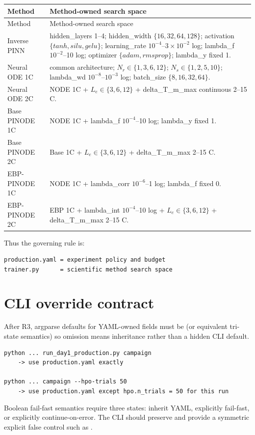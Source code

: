 \documentclass[10pt]{article}
\newcommand{\code}[1]{\texttt{\detokenize{#1}}}
\begin{document}
\begin{longtable}{L{0.24\textwidth}L{0.68\textwidth}}
\toprule
Method & Method-owned search space \\
\midrule
\endfirsthead
\toprule
Method & Method-owned search space \\
\midrule
\endhead
Inverse PINN & hidden\_layers 1--4; hidden\_width $\{16,32,64,128\}$; activation $\{tanh,silu,gelu\}$; learning\_rate $10^{-4}$--$3\times10^{-2}$ log; lambda\_f $10^{-2}$--10 log; optimizer $\{adam,rmsprop\}$; lambda\_y fixed 1. \\
Neural ODE 1C & common architecture; $N_r\in\{1,3,6,12\}$; $N_s\in\{1,2,5,10\}$; lambda\_wd $10^{-8}$--$10^{-3}$ log; batch\_size $\{8,16,32,64\}$. \\
Neural ODE 2C & NODE 1C + $L_e\in\{3,6,12\}$ + delta\_T\_m\_max continuous 2--15 C. \\
Base PINODE 1C & NODE 1C + lambda\_f $10^{-4}$--10 log; lambda\_y fixed 1. \\
Base PINODE 2C & Base 1C + $L_e\in\{3,6,12\}$ + delta\_T\_m\_max 2--15 C. \\
EBP-PINODE 1C & NODE 1C + lambda\_corr $10^{-6}$--1 log; lambda\_f fixed 0. \\
EBP-PINODE 2C & EBP 1C + lambda\_int $10^{-4}$--10 log + $L_e\in\{3,6,12\}$ + delta\_T\_m\_max 2--15 C. \\
\bottomrule
\end{longtable}

Thus the governing rule is:
\begin{verbatim}
production.yaml = experiment policy and budget
trainer.py      = scientific method search space
\end{verbatim}

\section{CLI override contract}
After R3, argparse defaults for YAML-owned fields must be \code{None} (or equivalent tri-state semantics) so omission means inheritance rather than a hidden CLI default.

\begin{verbatim}
python ... run_day1_production.py campaign
    -> use production.yaml exactly

python ... campaign --hpo-trials 50
    -> use production.yaml except hpo.n_trials = 50 for this run
\end{verbatim}

Boolean fail-fast semantics require three states: inherit YAML, explicitly fail-fast, or explicitly continue-on-error. The CLI should preserve \code{--fail-fast} and provide a symmetric explicit false control such as \code{--continue-on-error}.
\end{document}
